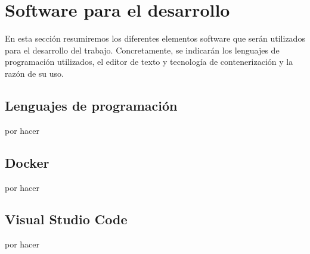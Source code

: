 \section{Software para el desarrollo}

En esta sección resumiremos los diferentes elementos software que serán utilizados para el desarrollo del trabajo. Concretamente, se indicarán los lenguajes de programación utilizados, el editor de texto y tecnología de contenerización y la razón de su uso.

\subsection{Lenguajes de programación}

por hacer

\subsection{Docker}

por hacer

\subsection{Visual Studio Code}

por hacer
